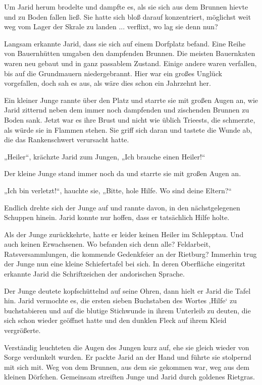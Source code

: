 Um Jarid herum brodelte und dampfte es, als sie sich aus dem Brunnen hievte und zu Boden fallen ließ. Sie hatte sich bloß darauf konzentriert, möglichst weit weg vom Lager der Skrale zu landen ... verflixt, wo lag sie denn nun?

Langsam erkannte Jarid, dass sie sich auf einem Dorfplatz befand. Eine Reihe von Bauernhütten umgaben den dampfenden Brunnen. Die meisten Bauernkaten waren neu gebaut und in ganz passablem Zustand. Einige andere waren verfallen, bis auf die Grundmauern niedergebrannt. Hier war ein großes Unglück vorgefallen, doch sah es aus, als wäre dies schon ein Jahrzehnt her.

Ein kleiner Junge rannte über den Platz und starrte sie mit großen Augen an, wie Jarid zitternd neben dem immer noch dampfenden und zischenden Brunnen zu Boden sank. Jetzt war es ihre Brust und nicht wie üblich Trieests, die schmerzte, als würde sie in Flammen stehen. Sie griff sich daran und tastete die Wunde ab, die das Rankenschwert verursacht hatte.

„Heiler“, krächzte Jarid zum Jungen, „Ich brauche einen Heiler!“

Der kleine Junge stand immer noch da und starrte sie mit großen Augen an.

„Ich bin verletzt!“, hauchte sie, „Bitte, hole Hilfe. Wo sind deine Eltern?“

Endlich drehte sich der Junge auf und rannte davon, in den nächstgelegenen Schuppen hinein. Jarid konnte nur hoffen, dass er tatsächlich Hilfe holte.

Als der Junge zurückkehrte, hatte er leider keinen Heiler im Schlepptau. Und auch keinen Erwachsenen. Wo befanden sich denn alle? Feldarbeit, Ratsversammlungen, die kommende Gedenkfeier an der Rietburg? Immerhin trug der Junge nun eine kleine Schiefertafel bei sich. In deren Oberfläche eingeritzt erkannte Jarid die Schriftzeichen der andorischen Sprache.

Der Junge deutete kopfschüttelnd auf seine Ohren, dann hielt er Jarid die Tafel hin. Jarid vermochte es, die ersten sieben Buchstaben des Wortes ‚Hilfe‘ zu buchstabieren und auf die blutige Stichwunde in ihrem Unterleib zu deuten, die sich schon wieder geöffnet hatte und den dunklen Fleck auf ihrem Kleid vergrößerte.

Verständig leuchteten die Augen des Jungen kurz auf, ehe sie gleich wieder von Sorge verdunkelt wurden. Er packte Jarid an der Hand und führte sie stolpernd mit sich mit. Weg von dem Brunnen, aus dem sie gekommen war, weg aus dem kleinen Dörfchen. Gemeinsam streiften Junge und Jarid durch goldenes Rietgras.

